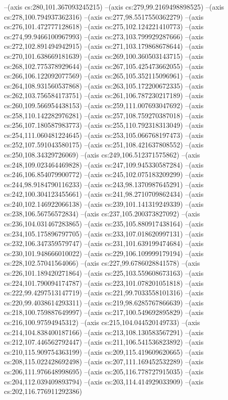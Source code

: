 --(axis cs:280,101.367093245215)
--(axis cs:279,99.2169498898525)
--(axis cs:278,100.794937362316)
--(axis cs:277,98.5517550362279)
--(axis cs:276,101.472777128618)
--(axis cs:275,102.124221410773)
--(axis cs:274,99.9466100967993)
--(axis cs:273,103.799929287666)
--(axis cs:272,102.891494942915)
--(axis cs:271,103.179868678644)
--(axis cs:270,101.638669181639)
--(axis cs:269,100.360503143715)
--(axis cs:268,102.775378929644)
--(axis cs:267,105.425473662055)
--(axis cs:266,106.122092077569)
--(axis cs:265,105.352115096961)
--(axis cs:264,108.931560537868)
--(axis cs:263,105.172200672335)
--(axis cs:262,103.756584173751)
--(axis cs:261,106.787230217189)
--(axis cs:260,109.566954438153)
--(axis cs:259,111.007693047692)
--(axis cs:258,110.142282976281)
--(axis cs:257,108.759270387018)
--(axis cs:256,107.180587983773)
--(axis cs:255,110.792318313049)
--(axis cs:254,111.060481224645)
--(axis cs:253,105.066768197473)
--(axis cs:252,107.591043580175)
--(axis cs:251,108.421637808552)
--(axis cs:250,108.34329726069)
--(axis cs:249,106.512371575862)
--(axis cs:248,109.023464469828)
--(axis cs:247,109.945330587284)
--(axis cs:246,106.854079900772)
--(axis cs:245,102.075183209299)
--(axis cs:244,98.9184790116233)
--(axis cs:243,98.1370987645291)
--(axis cs:242,100.304123455661)
--(axis cs:241,98.2710709862434)
--(axis cs:240,102.146922066138)
--(axis cs:239,101.141319249339)
--(axis cs:238,106.56756572834)
--(axis cs:237,105.200373827092)
--(axis cs:236,104.031467283865)
--(axis cs:235,105.880917438164)
--(axis cs:234,105.175896797705)
--(axis cs:233,107.018620997131)
--(axis cs:232,106.347359579747)
--(axis cs:231,101.639199474684)
--(axis cs:230,101.948666010022)
--(axis cs:229,106.109999179194)
--(axis cs:228,102.57041564066)
--(axis cs:227,99.6786028841578)
--(axis cs:226,101.189420271864)
--(axis cs:225,103.559608673163)
--(axis cs:224,101.790094174787)
--(axis cs:223,101.078201051818)
--(axis cs:222,99.4297513147719)
--(axis cs:221,99.7033558101316)
--(axis cs:220,99.4038614293311)
--(axis cs:219,98.6285767866639)
--(axis cs:218,100.759887649997)
--(axis cs:217,100.549692895829)
--(axis cs:216,100.97594945312)
--(axis cs:215,104.044520149733)
--(axis cs:214,104.838400187166)
--(axis cs:213,108.130583567291)
--(axis cs:212,107.446562792447)
--(axis cs:211,106.541536823892)
--(axis cs:210,115.909754363199)
--(axis cs:209,115.419609620665)
--(axis cs:208,115.022428692498)
--(axis cs:207,111.169452532289)
--(axis cs:206,111.976648998695)
--(axis cs:205,116.778727915035)
--(axis cs:204,112.039409893794)
--(axis cs:203,114.414929033909)
--(axis cs:202,116.776911292386)
